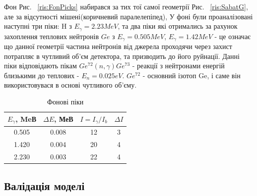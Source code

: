 \documentclass[a4paper, 14pt]{article}
\numberwithin{equation}{section}
\numberwithin{table}{section}
\begin{document}
Фон Рис. ~\ref{ris:FonPicks} набирався за тих тої самої геометрії Рис. ~\ref{ris:SabatG}, але за відсутності мішені(коричневий паралелепіпед), У фоні були проаналізовані наступні три піки: H з $E_\gamma = 2.23 MeV$, та два піки які отримались за рахунок захоплення теплових нейтронів $Ge$ з $E_\gamma = 0.505MeV$, $E_\gamma = 1.42 MeV$ - це означає що данної геометрії частина нейтронів від джерела проходячи через захист потрапляє в чутливий об'єм детектора, та призводить до його руйнації. Данні піки відповідають пікам $Ge^{72}(n, \gamma)Ge^{73}$ - реакції з нейтронами енергій близькими до теплових - $E_n = 0.025eV$. $Ge^{72}$ - основний ізотоп Ge, і саме він використовувася в основі чутливого об'єму.
\begin{table}[h]
	\centering
	\begin{tabular}{|c|c|c|c|} 
		\hline
		$E_{\gamma}$, MeВ & $\Delta{E}$, МеВ & $I = I_{\gamma} / I_{b}$ & $\Delta{I}$\\
		\hline
		0.505 & 0.008 & 12 & 3 \\
		\hline
		1.420 & 0.004 & 20 & 4 \\	
		\hline
		2.230 & 0.003 & 22 & 4 \\	
		\hline
	\end{tabular}
	\caption{Фонові піки} 
	\label{tabl:ResultsBackground}
\end{table}

\subsection{Валідація моделі}
\end{document}
